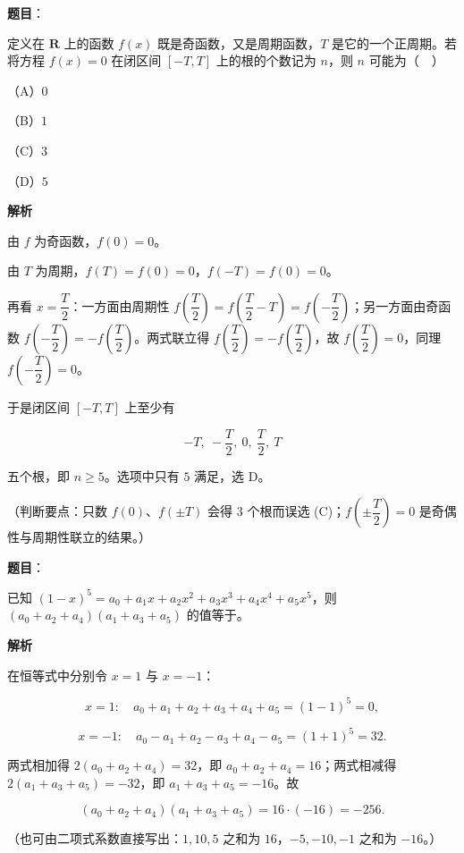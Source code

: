 \begin{answer}

\textbf{题目}：

定义在 $\mathbf R$ 上的函数 $f(x)$ 既是奇函数，又是周期函数，$T$ 是它的一个正周期。若将方程 $f(x)=0$ 在闭区间 $[-T,T]$ 上的根的个数记为 $n$，则 $n$ 可能为（　）

（A）$0$

（B）$1$

（C）$3$

（D）$5$

\textbf{解析}

由 $f$ 为奇函数，$f(0)=0$。

由 $T$ 为周期，$f(T)=f(0)=0$，$f(-T)=f(0)=0$。

再看 $x=\dfrac T2$：一方面由周期性 $f\left(\dfrac T2\right)=f\left(\dfrac T2-T\right)=f\left(-\dfrac T2\right)$；另一方面由奇函数 $f\left(-\dfrac T2\right)=-f\left(\dfrac T2\right)$。两式联立得 $f\left(\dfrac T2\right)=-f\left(\dfrac T2\right)$，故 $f\left(\dfrac T2\right)=0$，同理 $f\left(-\dfrac T2\right)=0$。

于是闭区间 $[-T,T]$ 上至少有

\nopagebreak[4]
\[-T,\ -\frac T2,\ 0,\ \frac T2,\ T\]

五个根，即 $n\geqslant5$。选项中只有 $5$ 满足，选 D。

（判断要点：只数 $f(0)$、$f(\pm T)$ 会得 $3$ 个根而误选 (C)；$f\left(\pm\dfrac T2\right)=0$ 是奇偶性与周期性联立的结果。）


\end{answer}
\begin{answer}

\textbf{题目}：

已知 $(1-x)^5=a_0+a_1x+a_2x^2+a_3x^3+a_4x^4+a_5x^5$，则 $(a_0+a_2+a_4)(a_1+a_3+a_5)$ 的值等于\gkblank{}。

\textbf{解析}

在恒等式中分别令 $x=1$ 与 $x=-1$：

\nopagebreak[4]
\[x=1:\quad a_0+a_1+a_2+a_3+a_4+a_5=(1-1)^5=0,\]

\nopagebreak[4]
\[x=-1:\quad a_0-a_1+a_2-a_3+a_4-a_5=(1+1)^5=32.\]

两式相加得 $2(a_0+a_2+a_4)=32$，即 $a_0+a_2+a_4=16$；两式相减得 $2(a_1+a_3+a_5)=-32$，即 $a_1+a_3+a_5=-16$。故

\nopagebreak[4]
\[(a_0+a_2+a_4)(a_1+a_3+a_5)=16\cdot(-16)=-256.\]

（也可由二项式系数直接写出：$1,10,5$ 之和为 $16$，$-5,-10,-1$ 之和为 $-16$。）


\end{answer}
